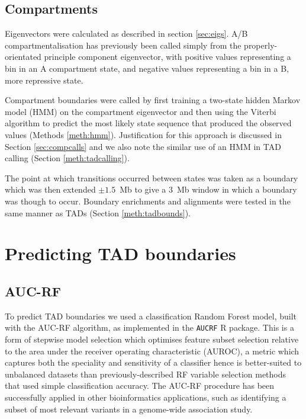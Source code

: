 \documentclass[a4paper,11pt,oneside]{book}
\begin{document}
\subsection{Compartments}\label{sec:compartments}

Eigenvectors were calculated as described in section \ref{sec:eigs}. A/B compartmentalisation has previously been called simply from the properly-orientated principle component eigenvector, with positive values representing a bin in an A compartment state, and negative values representing a bin in a B, more repressive state.\cite{Lieberman2009} 

Compartment boundaries were called by first training a two-state hidden
Markov model (HMM) on the compartment eigenvector and then using the
Viterbi algorithm to predict the most likely state sequence that
produced the observed values (Methods \ref{meth:hmm}). Justification for this approach is discussed in Section \ref{sec:compcalls} and we also note the similar use of an HMM in TAD calling (Section \ref{meth:tadcalling}).


The point at which transitions occurred
between states was taken as a boundary which was then extended $\pm 1.5$~Mb to give a $3$~Mb window in which a boundary was though to occur. Boundary enrichments and alignments were tested in the same manner as TADs (Section \ref{meth:tadbounds}).


\section{Predicting TAD boundaries}\label{meth:tadpred}

\subsection{AUC-RF}

To predict TAD boundaries we used a classification Random Forest model, built with the AUC-RF algorithm,\cite{Calle2011} as implemented in the \texttt{AUCRF} R package. This is a form of stepwise model selection which optimises feature subset selection relative to the area under the receiver operating characteristic (AUROC), a metric which captures both the speciality and sensitivity of a classifier hence is better-suited to unbalanced datasets than previously-described RF variable selection methods that used simple classification accuracy.\cite{Diaz2006, Chen2012} The AUC-RF procedure has been successfully applied in other bioinformatics applications, such as identifying a subset of most relevant variants in a genome-wide association study.\cite{DeMaturana2013} 
\end{document}
